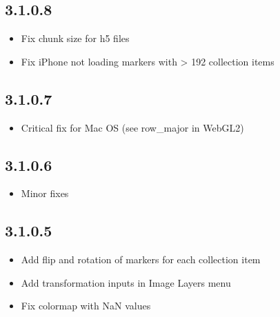 \documentclass[letterpaper,10pt,english,openany,oneside]{sphinxmanual}
\begin{document}
\subsection{3.1.0.8}
\label{\detokenize{docs/intro/versions:id16}}\begin{itemize}
\item {} 
\sphinxAtStartPar
Fix chunk size for h5 files

\item {} 
\sphinxAtStartPar
Fix iPhone not loading markers with \textgreater{} 192 collection items

\end{itemize}


\subsection{3.1.0.7}
\label{\detokenize{docs/intro/versions:id17}}\begin{itemize}
\item {} 
\sphinxAtStartPar
Critical fix for Mac OS (see row\_major in WebGL2)

\end{itemize}


\subsection{3.1.0.6}
\label{\detokenize{docs/intro/versions:id18}}\begin{itemize}
\item {} 
\sphinxAtStartPar
Minor fixes

\end{itemize}


\subsection{3.1.0.5}
\label{\detokenize{docs/intro/versions:id19}}\begin{itemize}
\item {} 
\sphinxAtStartPar
Add flip and rotation of markers for each collection item

\item {} 
\sphinxAtStartPar
Add transformation inputs in Image Layers menu

\item {} 
\sphinxAtStartPar
Fix colormap with NaN values

\end{itemize}
\end{document}
